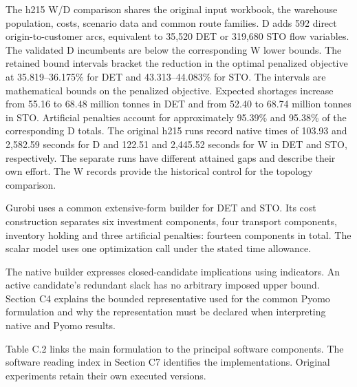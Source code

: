 \documentclass[
  english,
  11pt,
  a4paper,
]{article}
\begin{document}
The h215 W/D comparison shares the original input workbook, the
warehouse population, costs, scenario data and common route families. D
adds 592 direct origin-to-customer arcs, equivalent to 35,520 DET or
319,680 STO flow variables. The validated D incumbents are below the
corresponding W lower bounds. The retained bound intervals bracket the
reduction in the optimal penalized objective at 35.819--36.175\% for DET
and 43.313--44.083\% for STO. The intervals are mathematical bounds on
the penalized objective. Expected shortages increase from 55.16 to 68.48
million tonnes in DET and from 52.40 to 68.74 million tonnes in STO.
Artificial penalties account for approximately 95.39\% and 95.38\% of
the corresponding D totals. The original h215 runs record native times
of 103.93 and 2,582.59 seconds for D and 122.51 and 2,445.52 seconds for
W in DET and STO, respectively. The separate runs have different
attained gaps and describe their own effort. The W records provide the
historical control for the topology comparison.

Gurobi uses a common extensive-form builder for DET and STO. Its cost
construction separates six investment components, four transport
components, inventory holding and three artificial penalties: fourteen
components in total. The scalar model uses one optimization call under
the stated time allowance.

The native builder expresses closed-candidate implications using
indicators. An active candidate's redundant slack has no arbitrary
imposed upper bound. Section C4 explains the bounded representative used
for the common Pyomo formulation and why the representation must be
declared when interpreting native and Pyomo results.

Table C.2 links the main formulation to the principal software
components. The software reading index in Section C7 identifies the
implementations. Original experiments retain their own executed
versions.
\end{document}

